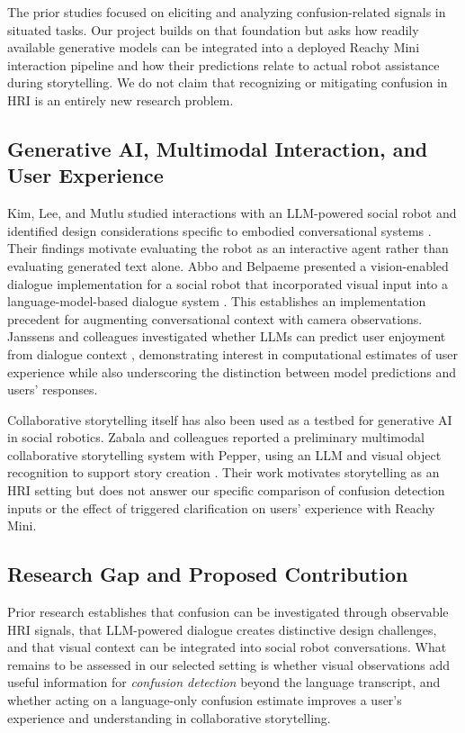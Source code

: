 \documentclass[conference]{IEEEtran}
\begin{document}
The prior studies focused on eliciting and analyzing confusion-related signals in situated tasks. Our project builds on that foundation but asks how readily available generative models can be integrated into a deployed Reachy Mini interaction pipeline and how their predictions relate to actual robot assistance during storytelling. We do not claim that recognizing or mitigating confusion in HRI is an entirely new research problem.

\subsection{Generative AI, Multimodal Interaction, and User Experience}
Kim, Lee, and Mutlu studied interactions with an LLM-powered social robot and identified design considerations specific to embodied conversational systems \cite{kim2024understanding}. Their findings motivate evaluating the robot as an interactive agent rather than evaluating generated text alone. Abbo and Belpaeme presented a vision-enabled dialogue implementation for a social robot that incorporated visual input into a language-model-based dialogue system \cite{abbo2025blind}. This establishes an implementation precedent for augmenting conversational context with camera observations. Janssens and colleagues investigated whether LLMs can predict user enjoyment from dialogue context \cite{janssens2025online}, demonstrating interest in computational estimates of user experience while also underscoring the distinction between model predictions and users' responses.

Collaborative storytelling itself has also been used as a testbed for generative AI in social robotics. Zabala and colleagues reported a preliminary multimodal collaborative storytelling system with Pepper, using an LLM and visual object recognition to support story creation \cite{zabala2025storytelling}. Their work motivates storytelling as an HRI setting but does not answer our specific comparison of confusion detection inputs or the effect of triggered clarification on users' experience with Reachy Mini.

\subsection{Research Gap and Proposed Contribution}
Prior research establishes that confusion can be investigated through observable HRI signals, that LLM-powered dialogue creates distinctive design challenges, and that visual context can be integrated into social robot conversations. What remains to be assessed in our selected setting is whether visual observations add useful information for \emph{confusion detection} beyond the language transcript, and whether acting on a language-only confusion estimate improves a user's experience and understanding in collaborative storytelling.
\end{document}
